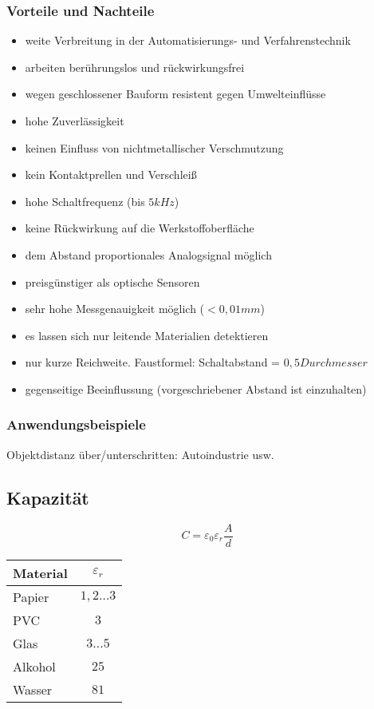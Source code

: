 \subsubsection{Vorteile und Nachteile}
\begin{itemize}[label=$+$]
\item weite Verbreitung in der Automatisierungs- und Verfahrenstechnik
\item arbeiten berührungslos und rückwirkungsfrei
\item wegen geschlossener Bauform resistent gegen Umwelteinflüsse
\item hohe Zuverlässigkeit
\item keinen Einfluss von nichtmetallischer Verschmutzung
\item kein Kontaktprellen und Verschleiß
\item hohe Schaltfrequenz (bis $5 \unit{kHz}$)
\item keine Rückwirkung auf die Werkstoffoberfläche
\item dem Abstand proportionales Analogsignal möglich
\item preisgünstiger als optische Sensoren
\item sehr hohe Messgenauigkeit möglich ($< 0,01 \unit{mm}$)
\end{itemize}
\begin{itemize}[label=$-$]
\item es lassen sich nur leitende Materialien detektieren
\item nur kurze Reichweite. Faustformel: Schaltabstand = $0,5 \unit{Durchmesser}$
\item gegenseitige Beeinflussung (vorgeschriebener Abstand ist einzuhalten)
\end{itemize}

\subsubsection{Anwendungsbeispiele}
Objektdistanz über/unterschritten: Autoindustrie usw.

\subsection{Kapazität}
$$C=\varepsilon_0 \varepsilon_r \frac{A}{d}$$
\begin{tabular}{l | c}
Material & $\varepsilon_r$\\\hline
Papier & $1,2\ldots 3$\\
PVC & $3$\\
Glas & $3 \ldots 5$\\
Alkohol & $25$\\
Wasser & $81$
\end{tabular}

